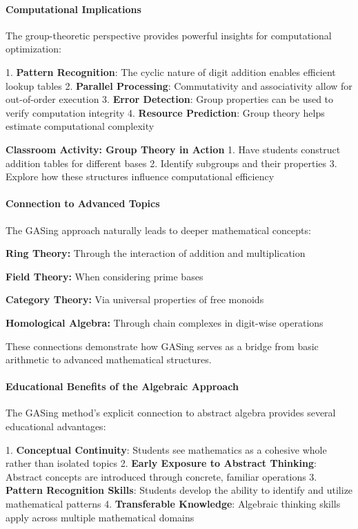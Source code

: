 \paragraph{Computational Implications}

The group-theoretic perspective provides powerful insights for computational optimization:

1. \textbf{Pattern Recognition}: The cyclic nature of digit addition enables efficient lookup tables
2. \textbf{Parallel Processing}: Commutativity and associativity allow for out-of-order execution
3. \textbf{Error Detection}: Group properties can be used to verify computation integrity
4. \textbf{Resource Prediction}: Group theory helps estimate computational complexity

\textbf{Classroom Activity: Group Theory in Action}
1. Have students construct addition tables for different bases
2. Identify subgroups and their properties
3. Explore how these structures influence computational efficiency
\paragraph{Connection to Advanced Topics}

The GASing approach naturally leads to deeper mathematical concepts:

\noindent\textbf{\textbf{Ring Theory}:} Through the interaction of addition and multiplication


\noindent\textbf{\textbf{Field Theory}:} When considering prime bases


\noindent\textbf{\textbf{Category Theory}:} Via universal properties of free monoids


\noindent\textbf{\textbf{Homological Algebra}:} Through chain complexes in digit-wise operations


These connections demonstrate how GASing serves as a bridge from basic arithmetic to advanced mathematical structures.
\paragraph{Educational Benefits of the Algebraic Approach}

The GASing method's explicit connection to abstract algebra provides several educational advantages:

1. \textbf{Conceptual Continuity}: Students see mathematics as a cohesive whole rather than isolated topics
2. \textbf{Early Exposure to Abstract Thinking}: Abstract concepts are introduced through concrete, familiar operations
3. \textbf{Pattern Recognition Skills}: Students develop the ability to identify and utilize mathematical patterns
4. \textbf{Transferable Knowledge}: Algebraic thinking skills apply across multiple mathematical domains

